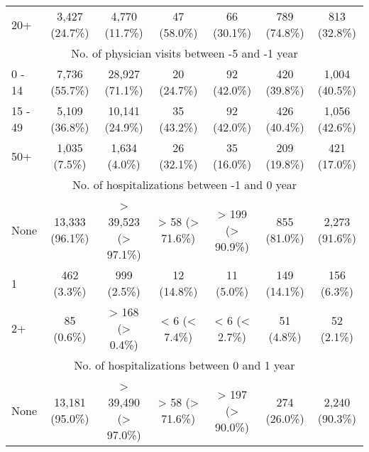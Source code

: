 \documentclass{article}
\begin{document}
\begin{table}[htbp]
\begin{tabular}{l*{6}{c}}
  20+                                                   &          3,427 (24.7\%)         &          4,770 (11.7\%)         &           47 (58.0\%)           &           66 (30.1\%)           &           789 (74.8\%)          &           813 (32.8\%)          \\
\multicolumn{7}{c}{No. of physician visits between -5 and -1 year          }\\
  0 - 14                                                &          7,736 (55.7\%)         &         28,927 (71.1\%)         &           20 (24.7\%)           &           92 (42.0\%)           &           420 (39.8\%)          &          1,004 (40.5\%)         \\
  15 - 49                                               &          5,109 (36.8\%)         &         10,141 (24.9\%)         &           35 (43.2\%)           &           92 (42.0\%)           &           426 (40.4\%)          &          1,056 (42.6\%)         \\
  50+                                                   &          1,035 (7.5\%)          &          1,634 (4.0\%)          &           26 (32.1\%)           &           35 (16.0\%)           &           209 (19.8\%)          &           421 (17.0\%)          \\
\multicolumn{7}{c}{No. of hospitalizations between -1 and 0 year           }\\
  None                                                  &         13,333 (96.1\%)         &       > 39,523 (> 97.1\%)       &         > 58 (> 71.6\%)         &         > 199 (> 90.9\%)        &           855 (81.0\%)          &          2,273 (91.6\%)         \\
  1                                                     &           462 (3.3\%)           &           999 (2.5\%)           &           12 (14.8\%)           &            11 (5.0\%)           &           149 (14.1\%)          &           156 (6.3\%)           \\
  2+                                                    &            85 (0.6\%)           &         > 168 (> 0.4\%)         &          < 6 (< 7.4\%)          &          < 6 (< 2.7\%)          &            51 (4.8\%)           &            52 (2.1\%)           \\
\multicolumn{7}{c}{No. of hospitalizations between 0 and 1 year            }\\
  None                                                  &         13,181 (95.0\%)         &       > 39,490 (> 97.0\%)       &         > 58 (> 71.6\%)         &         > 197 (> 90.0\%)        &           274 (26.0\%)          &          2,240 (90.3\%)         \\

\end{tabular}
\end{table}
\end{document}
